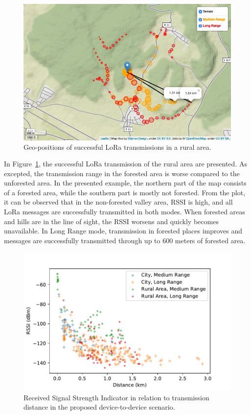 \begin{figure}[ht!]
    \centering
    \includegraphics[width=\textwidth]{gfx/rural.png}
    \caption{Geo-positions of successful LoRa transmissions in a rural area.}
    \label{hoechst2020lora:fig:eval_rural_new}
\end{figure}

In Figure~\ref{hoechst2020lora:fig:eval_rural_new}, the successful LoRa transmission of the rural area are presented.
As excepted, the transmission range in the forested area is worse compared to the unforested area.
In the presented example, the northern part of the map consists of a forested area, while the southern part is mostly not forested.
From the plot, it can be observed that in the non-forested valley area, RSSI is high, and all LoRa messages are successfully transmitted in both modes. 
When forested areas and hills are in the line of sight, the RSSI worsens and quickly becomes unavailable.
In Long Range mode, transmission in forested places improves and messages are successfully transmitted through up to 600 meters of forested area.

\begin{figure}[ht!]
    \centering
    \includegraphics[width=.8\textwidth]{gfx/rssi-distance.pdf}
    \caption{Received Signal Strength Indicator in relation to transmission distance in the proposed device-to-device scenario.}
    \label{hoechst2020lora:fig:eval_rssi}
\end{figure}

